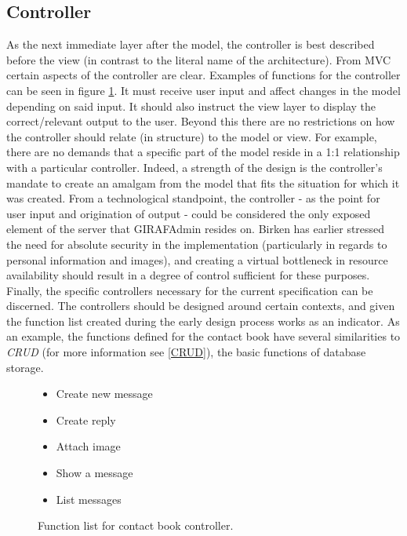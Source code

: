 \subsection{Controller}
As the next immediate layer after the model, the controller is best described before the view (in contrast to the literal name of the architecture).
From MVC certain aspects of the controller are clear. Examples of functions for the controller can be seen in figure \ref{fig_controller_cb}. It must receive user input and affect changes in the model depending on said input. It should also instruct the view layer to display the correct/relevant output to the user.
Beyond this there are no restrictions on how the controller should relate (in structure) to the model or view. For example, there are no demands that a specific part of the model reside in a 1:1 relationship with a particular controller. Indeed, a strength of the design is the controller's mandate to create an amalgam from the model that fits the situation for which it was created.
From a technological standpoint, the controller - as the point for user input and origination of output - could be considered the only exposed element of the server that GIRAFAdmin resides on. Birken has earlier stressed the need for absolute security in the implementation (particularly in regards to personal information and images), and creating a virtual bottleneck in resource availability should result in a degree of control sufficient for these purposes.
Finally, the specific controllers necessary for the current specification can be discerned. The controllers should be designed around certain contexts, and given the function list created during the early design process works as an indicator. As an example, the functions defined for the contact book have several similarities to \emph{CRUD} (for more information see \vref{CRUD}), the basic functions of database storage.

\begin{figure}[ht]
	\begin{itemize}
		\item Create new message
		\item Create reply
		\item Attach image
		\item Show a message
		\item List messages
	\end{itemize}
	\caption{\label{fig_controller_cb}Function list for contact book controller.}
\end{figure}

